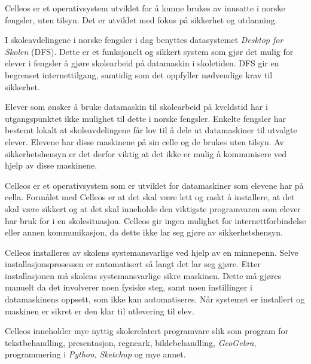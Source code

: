 \vfill\eject

\topglue 1pc

Celleos er et operativsystem utviklet for \aa{} kunne brukes av innsatte i norske fengsler, uten tilsyn. Det er utviklet med fokus p\aa{} sikkerhet og utdanning.



I skoleavdelingene i norske fengsler i dag benyttes datasystemet {\it Desktop for Skolen} (DFS). Dette er et funksjonelt og sikkert system som gj\o r det mulig for elever i fengsler \aa{} gj\o re skolearbeid p\aa{} datamaskin i skoletiden. DFS gir en begrenset internettilgang, samtidig som det oppfyller n\o dvendige krav til sikkerhet.

Elever som \o nsker \aa{} bruke datamaskin til skolearbeid p\aa{} kveldstid har i utgangspunktet ikke mulighet til dette i norske fengsler. Enkelte fengsler har bestemt lokalt at skoleavdelingene f\aa r lov til \aa{} dele ut datamaskiner til utvalgte elever. Elevene har disse maskinene p\aa{} sin celle og de brukes uten tilsyn. Av sikkerhetshensyn er det derfor viktig at det ikke er mulig \aa{} kommunisere ved hjelp av disse maskinene.

Celleos er et operativsystem som er utviklet for datamaskiner som elevene har p\aa{} cella. Form\aa let med Celleos er at det skal v\ae re lett og raskt \aa{} installere, at det skal v\ae re sikkert og at det skal inneholde den viktigste programvaren som elever har bruk for i en skolesituasjon. Celleos gir ingen mulighet for internettforbindelse eller annen kommunikasjon, da dette ikke lar seg gj\o re av sikkerhetshensyn.


Celleos installeres av skolens systemansvarlige ved hjelp av en minnepenn. Selve installasjonsprosessen er automatisert s\aa{} langt det lar seg gj\o re. Etter installasjonen m\aa{} skolens systemansvarlige sikre maskinen. Dette m\aa{} gj\o res manuelt da det involverer noen fysiske steg, samt noen instillinger i datamaskinens oppsett, som ikke kan automatiseres. N\aa r systemet er installert og maskinen er sikret er den klar til utlevering til elev.

Celleos inneholder mye nyttig skolerelatert programvare slik som program for tekstbehandling, presentasjon, regneark, bildebehandling, {\it GeoGebra}, programmering i {\it Python}, {\it Sketchup} og mye annet.

